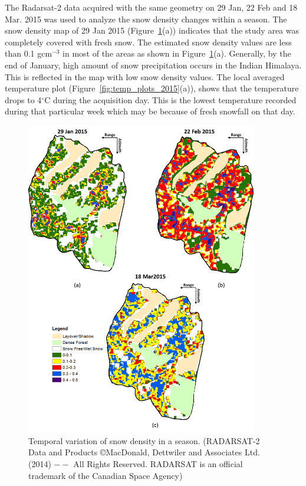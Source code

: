 The Radarsat-2 data acquired with the same geometry on 29 Jan, 22 Feb and 18 Mar. 2015 was used to analyze the snow density changes within a season. The snow density map of 29 Jan 2015 (Figure~\ref{fig:multi_temp_density}(a)) indicates that the study area was completely covered with fresh snow. The estimated snow density values are less than 0.1 gcm$^{-3}$ in most of the areas as shown in Figure~\ref{fig:multi_temp_density}(a). Generally, by the end of January, high amount of snow precipitation occurs in the Indian Himalaya. This is reflected in the map with low snow density values. The local averaged temperature plot (Figure~\ref{fig:temp_plots_2015}(a)), shows that the temperature drops to 4$^\circ$C during the acquisition day. This is the lowest temperature recorded during that particular week which may be because of fresh snowfall on that day. 

\begin{figure}[!htbp]
	\centering
	\includegraphics[width=0.9\textwidth]{Figures_sd/temporal_variability_SD}
	\caption[Multi temporal snow density maps] {Temporal variation of snow density in a season. (RADARSAT-2 Data and Products ©MacDonald, Dettwiler and Associates Ltd. (2014) $--$ All Rights Reserved. RADARSAT is an official trademark of the Canadian Space Agency)}
	\label{fig:multi_temp_density}
\end{figure}

